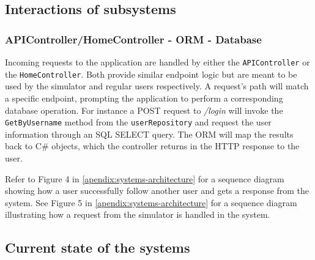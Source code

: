 \subsection{Interactions of subsystems}
\subsubsection{APIController/HomeController - ORM - Database} 
Incoming requests to the application are handled by either the \texttt{APIController} or the \texttt{HomeController}. Both provide similar endpoint logic but are meant to be used by the simulator and regular users respectively. A request's path will match a specific endpoint, prompting the application to perform a corresponding database operation. For instance a POST request to \textit{/login} will invoke the \texttt{GetByUsername} method from the \texttt{userRepository} and request the user information through an SQL SELECT query. The ORM will map the results back to C\# objects, which the controller returns in the HTTP response to the user.

Refer to Figure 4 in \ref{apendix:systems-architecture} for a sequence diagram showing how a user successfully follow another user and gets a response from the system. See Figure 5 in \ref{apendix:systems-architecture} for a sequence diagram illustrating how a request from the simulator is handled in the system.

\subsection{Current state of the systems}
